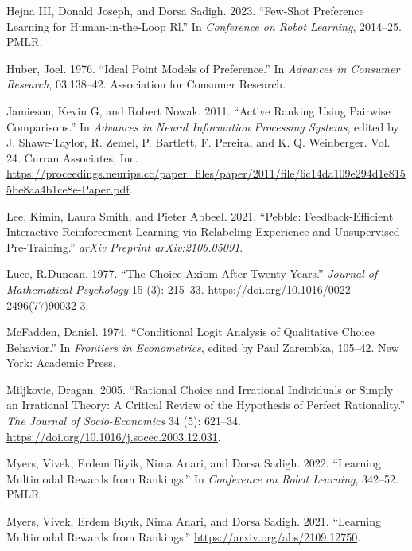 \documentclass[
  letterpaper,
  numbers=noenddot,
  DIV=11]{scrreprt}
\newlength{\cslhangindent}
\newenvironment{CSLReferences}[2] %
 {\begin{list}{}{%
  \setlength{\itemindent}{0pt}
  \setlength{\leftmargin}{0pt}
  \setlength{\parsep}{0pt}
  \ifodd #1
   \setlength{\leftmargin}{\cslhangindent}
   \setlength{\itemindent}{-1\cslhangindent}
  \fi
  \setlength{\itemsep}{#2\baselineskip}}}
 {\end{list}}
\theoremstyle{plain}
\theoremstyle{definition}
\theoremstyle{plain}
\theoremstyle{remark}
\begin{document}
\begin{CSLReferences}{1}{0}
Hejna III, Donald Joseph, and Dorsa Sadigh. 2023. {``Few-Shot Preference
Learning for Human-in-the-Loop Rl.''} In \emph{Conference on Robot
Learning}, 2014--25. PMLR.

Huber, Joel. 1976. {``Ideal Point Models of Preference.''} In
\emph{Advances in Consumer Research}, 03:138--42. Association for
Consumer Research.

Jamieson, Kevin G, and Robert Nowak. 2011. {``Active Ranking Using
Pairwise Comparisons.''} In \emph{Advances in Neural Information
Processing Systems}, edited by J. Shawe-Taylor, R. Zemel, P. Bartlett,
F. Pereira, and K. Q. Weinberger. Vol. 24. Curran Associates, Inc.
\url{https://proceedings.neurips.cc/paper_files/paper/2011/file/6c14da109e294d1e8155be8aa4b1ce8e-Paper.pdf}.

Lee, Kimin, Laura Smith, and Pieter Abbeel. 2021. {``Pebble:
Feedback-Efficient Interactive Reinforcement Learning via Relabeling
Experience and Unsupervised Pre-Training.''} \emph{arXiv Preprint
arXiv:2106.05091}.

Luce, R.Duncan. 1977. {``The Choice Axiom After Twenty Years.''}
\emph{Journal of Mathematical Psychology} 15 (3): 215--33.
\url{https://doi.org/10.1016/0022-2496(77)90032-3}.

McFadden, Daniel. 1974. {``Conditional Logit Analysis of Qualitative
Choice Behavior.''} In \emph{Frontiers in Econometrics}, edited by Paul
Zarembka, 105--42. New York: Academic Press.

Miljkovic, Dragan. 2005. {``Rational Choice and Irrational Individuals
or Simply an Irrational Theory: A Critical Review of the Hypothesis of
Perfect Rationality.''} \emph{The Journal of Socio-Economics} 34 (5):
621--34. \url{https://doi.org/10.1016/j.socec.2003.12.031}.

Myers, Vivek, Erdem Biyik, Nima Anari, and Dorsa Sadigh. 2022.
{``Learning Multimodal Rewards from Rankings.''} In \emph{Conference on
Robot Learning}, 342--52. PMLR.

Myers, Vivek, Erdem Bıyık, Nima Anari, and Dorsa Sadigh. 2021.
{``Learning Multimodal Rewards from Rankings.''}
\url{https://arxiv.org/abs/2109.12750}.


\end{CSLReferences}
\end{document}

